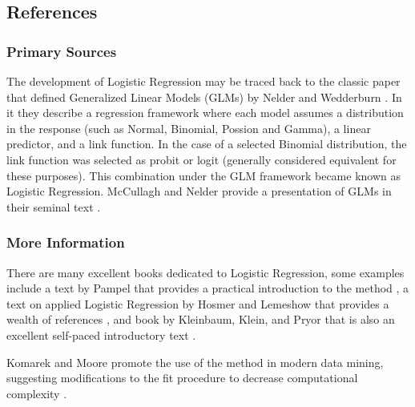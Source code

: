 \subsection{References}

\subsubsection{Primary Sources}
The development of Logistic Regression may be traced back to the classic paper that defined Generalized Linear Models (GLMs) by Nelder and Wedderburn \cite{Nelder1972}. In it they describe a regression framework where each model assumes a distribution in the response (such as Normal, Binomial, Possion and Gamma), a linear predictor, and a link function. In the case of a selected Binomial distribution, the link function was selected as probit or logit (generally considered equivalent for these purposes). This combination under the GLM framework became known as Logistic Regression.
McCullagh and Nelder provide a presentation of GLMs in their seminal text \cite{McCullagh1989}.


\subsubsection{More Information}
There are many excellent books dedicated to Logistic Regression, some examples include a text by Pampel that provides a practical introduction to the method \cite{Pampel2000}, a text on applied Logistic Regression by Hosmer and Lemeshow that provides a wealth of references \cite{Hosmer2000}, and book by Kleinbaum, Klein, and Pryor that is also an excellent self-paced introductory text \cite{Kleinbaum2010}.

Komarek and Moore promote the use of the method in modern data mining, suggesting modifications to the fit procedure to decrease computational complexity \cite{Komarek2005}.



